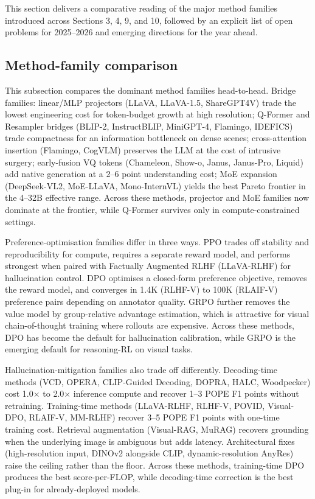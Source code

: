 \documentclass{article}
\begin{document}
This section delivers a comparative reading of the major method families introduced across Sections 3, 4, 9, and 10, followed by an explicit list of open problems for 2025--2026 and emerging directions for the year ahead.

\subsection{Method-family comparison}\label{method-family-comparison}

This subsection compares the dominant method families head-to-head. Bridge families: linear/MLP projectors (LLaVA, LLaVA-1.5, ShareGPT4V) trade the lowest engineering cost for token-budget growth at high resolution; Q-Former and Resampler bridges (BLIP-2, InstructBLIP, MiniGPT-4, Flamingo, IDEFICS) trade compactness for an information bottleneck on dense scenes; cross-attention insertion (Flamingo, CogVLM) preserves the LLM at the cost of intrusive surgery; early-fusion VQ tokens (Chameleon, Show-o, Janus, Janus-Pro, Liquid) add native generation at a 2--6 point understanding cost; MoE expansion (DeepSeek-VL2, MoE-LLaVA, Mono-InternVL) yields the best Pareto frontier in the 4--32B effective range. Across these methods, projector and MoE families now dominate at the frontier, while Q-Former survives only in compute-constrained settings.

Preference-optimisation families differ in three ways. PPO trades off stability and reproducibility for compute, requires a separate reward model, and performs strongest when paired with Factually Augmented RLHF (LLaVA-RLHF) for hallucination control. DPO optimises a closed-form preference objective, removes the reward model, and converges in 1.4K (RLHF-V) to 100K (RLAIF-V) preference pairs depending on annotator quality. GRPO further removes the value model by group-relative advantage estimation, which is attractive for visual chain-of-thought training where rollouts are expensive. Across these methods, DPO has become the default for hallucination calibration, while GRPO is the emerging default for reasoning-RL on visual tasks.

Hallucination-mitigation families also trade off differently. Decoding-time methods (VCD, OPERA, CLIP-Guided Decoding, DOPRA, HALC, Woodpecker) cost 1.0× to 2.0× inference compute and recover 1--3 POPE F1 points without retraining. Training-time methods (LLaVA-RLHF, RLHF-V, POVID, Visual-DPO, RLAIF-V, MM-RLHF) recover 3--5 POPE F1 points with one-time training cost. Retrieval augmentation (Visual-RAG, MuRAG) recovers grounding when the underlying image is ambiguous but adds latency. Architectural fixes (high-resolution input, DINOv2 alongside CLIP, dynamic-resolution AnyRes) raise the ceiling rather than the floor. Across these methods, training-time DPO produces the best score-per-FLOP, while decoding-time correction is the best plug-in for already-deployed models.
\end{document}
